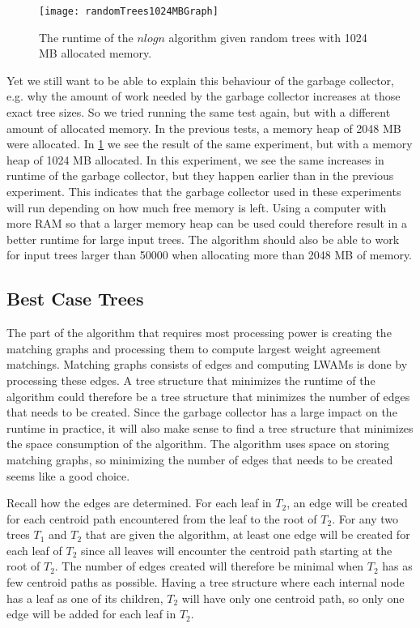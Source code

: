 \begin{figure}
	\texttt{[image: randomTrees1024MBGraph]}
	\caption{The runtime of the $nlogn$ algorithm given random trees with 1024 MB allocated memory.}
	\label{randomTrees1024MBGraph}
\end{figure}

Yet we still want to be able to explain this behaviour of the garbage collector, e.g. why the amount of work needed by the garbage collector increases at those exact tree sizes. So we tried running the same test again, but with a different amount of allocated memory. In the previous tests, a memory heap of 2048 MB were allocated. In \ref{randomTrees1024MBGraph} we see the result of the same experiment, but with a memory heap of 1024 MB allocated. In this experiment, we see the same increases in runtime of the garbage collector, but they happen earlier than in the previous experiment. This indicates that the garbage collector used in these experiments will run depending on how much free memory is left. Using a computer with more RAM so that a larger memory heap can be used could therefore result in a better runtime for large input trees. The algorithm should also be able to work for input trees larger than 50000 when allocating more than 2048 MB of memory.

\subsection{Best Case Trees}
The part of the algorithm that requires most processing power is creating the matching graphs and processing them to compute largest weight agreement matchings. Matching graphs consists of edges and computing LWAMs is done by processing these edges. A tree structure that minimizes the runtime of the algorithm could therefore be a tree structure that minimizes the number of edges that needs to be created. Since the garbage collector has a large impact on the runtime in practice, it will also make sense to find a tree structure that minimizes the space consumption of the algorithm. The algorithm uses space on storing matching graphs, so minimizing the number of edges that needs to be created seems like a good choice.

Recall how the edges are determined. For each leaf in $T_2$, an edge will be created for each centroid path encountered from the leaf to the root of $T_2$. For any two trees $T_1$ and $T_2$ that are given the algorithm, at least one edge will be created for each leaf of $T_2$ since all leaves will encounter the centroid path starting at the root of $T_2$. The number of edges created will therefore be minimal when $T_2$ has as few centroid paths as possible. Having a tree structure where each internal node has a leaf as one of its children, $T_2$ will have only one centroid path, so only one edge will be added for each leaf in $T_2$.

